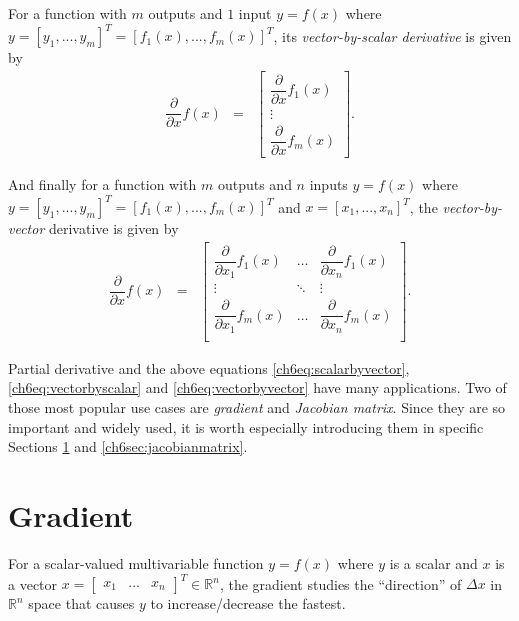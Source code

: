 For a function with $m$ outputs and $1$ input $y=f(x)$ where $y = \left[y_1,...,y_m\right]^T = \left[f_1(x),...,f_m(x)\right]^T$, its \textit{vector-by-scalar derivative} is given by
\begin{eqnarray}
	\dfrac{\partial}{\partial x}f(x) &=& \left[\begin{array}{c}
	\dfrac{\partial}{\partial x}f_1(x) \\
	\vdots \\
	\dfrac{\partial}{\partial x}f_m(x)
	\end{array}\right]. \label{ch6eq:vectorbyscalar}
\end{eqnarray}

And finally for a function with $m$ outputs and $n$ inputs $y=f(x)$ where $y = \left[y_1,...,y_m\right]^T = \left[f_1(x),...,f_m(x)\right]^T$ and $x = \left[x_1,...,x_n\right]^T$, the \textit{vector-by-vector} derivative is given by
\begin{eqnarray}
	\dfrac{\partial}{\partial x}f(x) &=& \left[\begin{array}{ccc}
	\dfrac{\partial}{\partial x_1}f_1(x) & \ldots & \dfrac{\partial}{\partial x_n}f_1(x) \\
	\vdots & \ddots & \vdots \\
	\dfrac{\partial}{\partial x_1}f_m(x) & \ldots & \dfrac{\partial}{\partial x_n}f_m(x) \\
	\end{array}\right]. \label{ch6eq:vectorbyvector}
\end{eqnarray}

Partial derivative and the above equations \eqref{ch6eq:scalarbyvector}, \eqref{ch6eq:vectorbyscalar} and \eqref{ch6eq:vectorbyvector} have many applications. Two of those most popular use cases are \textit{gradient} and \textit{Jacobian matrix}. Since they are so important and widely used, it is worth especially introducing them in specific Sections \ref{ch6sec:gradient} and \ref{ch6sec:jacobianmatrix}.

\section{Gradient} \label{ch6sec:gradient}

For a scalar-valued multivariable function $y=f(x)$ where $y$ is a scalar and $x$ is a vector $x = \left[\begin{array}{ccc}
                                                                               x_1 & \ldots & x_n
                                                                             \end{array}\right]^T \in \mathbb{R}^n$, the gradient studies the ``direction'' of $\Delta x$ in $\mathbb{R}^n$ space that causes $y$ to increase/decrease the fastest.

